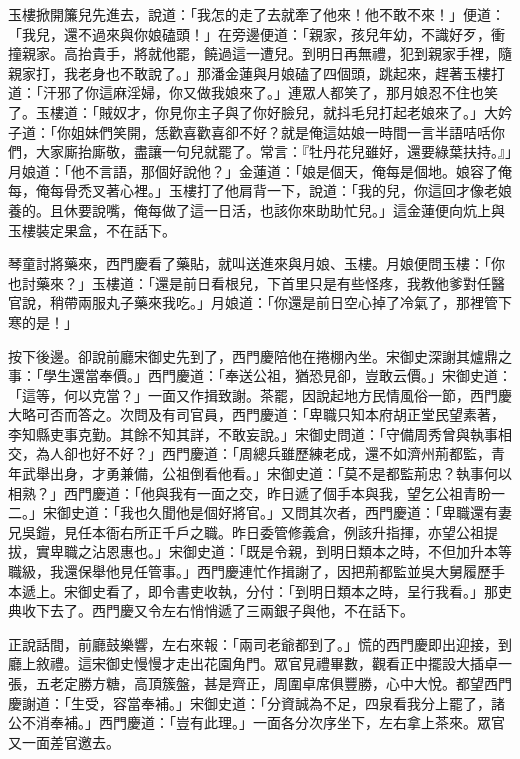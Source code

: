 玉樓掀開簾兒先進去，說道：「我怎的走了去就牽了他來！他不敢不來！」便道：「我兒，還不過來與你娘磕頭！」在旁邊便道：「親家，孩兒年幼，不識好歹，衝撞親家。高抬貴手，將就他罷，饒過這一遭兒。到明日再無禮，犯到親家手裡，隨親家打，我老身也不敢說了。」那潘金蓮與月娘磕了四個頭，跳起來，趕著玉樓打道：「汗邪了你這麻淫婦，你又做我娘來了。」連眾人都笑了，那月娘忍不住也笑了。玉樓道：「賊奴才，你見你主子與了你好臉兒，就抖毛兒打起老娘來了。」大妗子道：「你姐妹們笑開，恁歡喜歡喜卻不好？就是俺這姑娘一時間一言半語咭咶你們，大家廝抬廝敬，盡讓一句兒就罷了。常言：『牡丹花兒雖好，還要綠葉扶持。』」月娘道：「他不言語，那個好說他？」金蓮道：「娘是個天，俺每是個地。娘容了俺每，俺每骨禿叉著心裡。」玉樓打了他肩背一下，說道：「我的兒，你這回才像老娘養的。且休要說嘴，俺每做了這一日活，也該你來助助忙兒。」這金蓮便向炕上與玉樓裝定果盒，不在話下。

琴童討將藥來，西門慶看了藥貼，就叫送進來與月娘、玉樓。月娘便問玉樓：「你也討藥來？」玉樓道：「還是前日看根兒，下首里只是有些怪疼，我教他爹對任醫官說，稍帶兩服丸子藥來我吃。」月娘道：「你還是前日空心掉了冷氣了，那裡管下寒的是！」

按下後邊。卻說前廳宋御史先到了，西門慶陪他在捲棚內坐。宋御史深謝其爐鼎之事：「學生還當奉價。」西門慶道：「奉送公祖，猶恐見卻，豈敢云價。」宋御史道：「這等，何以克當？」一面又作揖致謝。茶罷，因說起地方民情風俗一節，西門慶大略可否而答之。次問及有司官員，西門慶道：「卑職只知本府胡正堂民望素著，李知縣吏事克勤。其餘不知其詳，不敢妄說。」宋御史問道：「守備周秀曾與執事相交，為人卻也好不好？」西門慶道：「周總兵雖歷練老成，還不如濟州荊都監，青年武舉出身，才勇兼備，公祖倒看他看。」宋御史道：「莫不是都監荊忠？執事何以相熟？」西門慶道：「他與我有一面之交，昨日遞了個手本與我，望乞公祖青盼一二。」宋御史道：「我也久聞他是個好將官。」又問其次者，西門慶道：「卑職還有妻兄吳鎧，見任本衙右所正千戶之職。昨日委管修義倉，例該升指揮，亦望公祖提拔，實卑職之沾恩惠也。」宋御史道：「既是令親，到明日類本之時，不但加升本等職級，我還保舉他見任管事。」西門慶連忙作揖謝了，因把荊都監並吳大舅履歷手本遞上。宋御史看了，即令書吏收執，分付：「到明日類本之時，呈行我看。」那吏典收下去了。西門慶又令左右悄悄遞了三兩銀子與他，不在話下。

正說話間，前廳鼓樂響，左右來報：「兩司老爺都到了。」慌的西門慶即出迎接，到廳上敘禮。這宋御史慢慢才走出花園角門。眾官見禮畢數，觀看正中擺設大插卓一張，五老定勝方糖，高頂簇盤，甚是齊正，周圍卓席俱豐勝，心中大悅。都望西門慶謝道：「生受，容當奉補。」宋御史道：「分資誠為不足，四泉看我分上罷了，諸公不消奉補。」西門慶道：「豈有此理。」一面各分次序坐下，左右拿上茶來。眾官又一面差官邀去。

